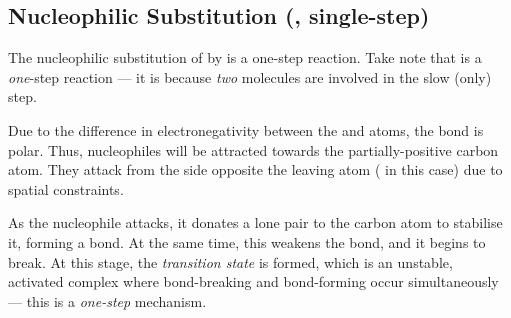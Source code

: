 		\pagebreak
		\subsection{Nucleophilic Substitution (\sntwo{}, single-step)}

			The nucleophilic substitution of  by  is a one-step reaction. Take note that \sntwo{} is a
			\textit{one}-step reaction --- it is \sntwo{} because \textit{two} molecules are involved in the slow (only) step.



			Due to the difference in electronegativity between the  and  atoms, the  bond is polar. Thus,
			nucleophiles will be attracted towards the partially-positive carbon atom. They attack from the side opposite the
			leaving atom ( in this case) due to spatial constraints.

			As the nucleophile attacks, it donates a lone pair to the carbon atom to stabilise it, forming a bond. At the same time, this
			weakens the  bond, and it begins to break. At this stage, the \textit{transition state} is formed, which is an
			unstable, activated complex where bond-breaking and bond-forming occur simultaneously --- this is a \textit{one-step} mechanism.

